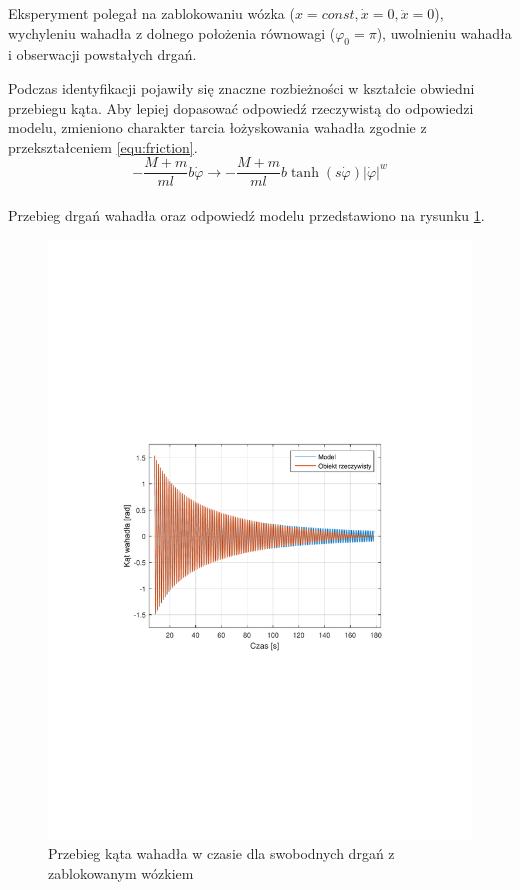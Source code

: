 \documentclass[12pt]{article}
\begin{document}
Eksperyment polegał na zablokowaniu wózka ($x = const,\dot{x} = 0,
\ddot{x} = 0$), wychyleniu wahadła z dolnego położenia równowagi
($\varphi_0=\pi$), uwolnieniu wahadła i obserwacji powstałych drgań.

Podczas identyfikacji pojawiły się znaczne rozbieżności w kształcie obwiedni
przebiegu kąta. Aby lepiej dopasować odpowiedź rzeczywistą do odpowiedzi modelu,
zmieniono charakter tarcia łożyskowania wahadła zgodnie z przekształceniem
\eqref{equ:friction}.\\

\begin{equation}
    -\frac{M+m}{ml}b\dot{\varphi} \rightarrow
    -\frac{M+m}{ml}b\tanh(s\dot{\varphi})|\dot{\varphi}|^w
    \label{equ:friction}
\end{equation}\\

Przebieg drgań wahadła oraz odpowiedź modelu przedstawiono na rysunku
\ref{rys:idf_pend1}.

\begin{figure}[!htb]
    \begin{center}
        \includegraphics[width=16cm,trim=3cm 9cm 3cm 9cm,clip]
        {../res/img/idf_pend1.pdf}
    \end{center}
    \caption{Przebieg kąta wahadła w czasie dla swobodnych drgań z zablokowanym
    wózkiem} 
    \label{rys:idf_pend1}
\end{figure}
\end{document}
